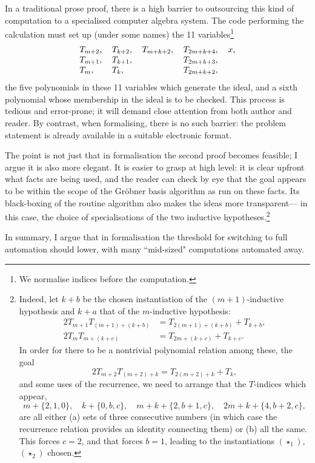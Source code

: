 \documentclass[12pt]{llncs}
\begin{document}
In a traditional prose proof,
there is a high barrier to outsourcing this kind of computation to a specialised computer algebra system.
The code performing the calculation must set up (under some names) the 11 variables\footnote{
  We normalise indices before the computation.
}
\[
  \begin{tabular}{llllll}
  $T_{m+2}$,&
  $T_{k+2}$,&
  $T_{m+k+2}$,&
  $T_{2m+k+4}$,&
  $x$,\\
  $T_{m+1}$,&
  $T_{k+1}$,&&
  $T_{2m+k+3}$,\\
  $T_m$,&
  $T_{k}$,&&
  $T_{2m+k+2},$
  \end{tabular}
\]
the five polynomials in these 11 variables which generate the ideal,
and a sixth polynomial whose membership in the ideal is to be checked.
This process is tedious and error-prone;
it will demand close attention from both author and reader.
By contrast, when formalising, there is no such barrier:
the problem statement is already available in a suitable electronic format.

The point is not just that in formalisation the second proof becomes feasible;
I argue  it is also more elegant.
It is easier to grasp at high level:
it is clear upfront what facts are being used,
and the reader can check by eye that the goal appears to be within the scope of the Gr\"obner basis algorithm as run on these facts.
Its black-boxing of the routine algorithm also makes the ideas more transparent---%
in this case, the choice of specialisations of the two 
inductive hypotheses.\footnote{
Indeed, let $k+b$ be the chosen instantiation of the $(m+1)$-inductive hypothesis
and $k+a$ that of the $m$-inductive hypothesis:
\begin{align*}
  2T_{m+1}T_{(m+1)+(k+b)}&=T_{2(m+1)+(k+b)}+T_{k+b},\\
  2T_mT_{m+(k+c)}&=T_{2m+(k+c)}+T_{k+c}.
\end{align*}
In order for there to be a nontrivial polynomial relation among these, the goal
\[
  2T_{m+2}T_{(m+2)+k}=T_{2(m+2)+k}+T_{k},
\]
and some uses of the recurrence,
we need to arrange that the $T$-indices which appear, 
\[
  m+\{2,1,0\},\quad k+\{0,b, c\},\quad
  m+k+\{2, b+1, c\},\quad 2m+k+\{4, b+2, c\},
\]
are all either (a) sets of three consecutive numbers
(in which case the recurrence relation provides an identity connecting them)
or (b) all the same.
This forces $c=2$, and that forces $b=1$,
leading to the instantiations $(\star_1)$, $(\star_2)$ chosen.}

In summary, I argue that in formalisation the threshold for switching to full automation 
should lower,
with many ``mid-sized" computations automated away.
\end{document}
